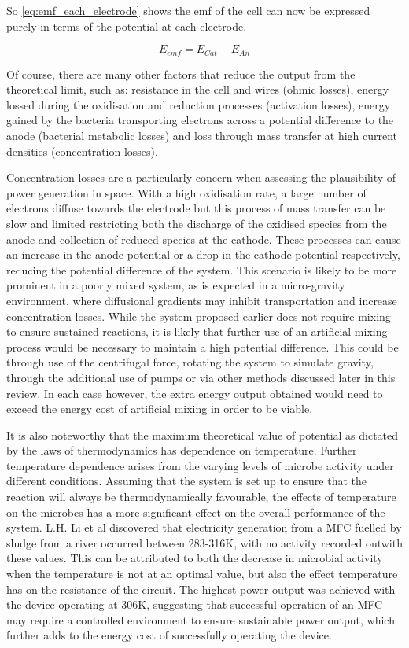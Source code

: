 \documentclass[12pt]{article}
\begin{document}
So \cref{eq:emf_each_electrode} shows the emf of the cell can now be expressed purely in terms of the potential at each electrode. \cite{logan2006microbial}

\begin{equation}
E_{emf} = E_{Cat} - E_{An}
\label{eq:emf_each_electrode}
\end{equation}

Of course, there are many other factors that reduce the output from the theoretical limit, such as: resistance in the cell and wires (ohmic losses), energy lossed during the oxidisation and reduction processes (activation losses), energy gained by the bacteria transporting electrons across a potential difference to the anode (bacterial metabolic losses) and loss through mass transfer at high current densities (concentration losses).\cite{logan2006microbial}

Concentration losses are a particularly concern when assessing the plausibility of power generation in space. With a high oxidisation rate, a large number of electrons diffuse towards the electrode but this process of mass transfer can be slow and limited restricting both the discharge of the oxidised species from the anode and collection of reduced species at the cathode. These processes can cause an increase in the anode potential or a drop in the cathode potential respectively, reducing the potential difference of the system. This scenario is likely to be more prominent in a poorly mixed system, as is expected in a micro-gravity environment, where diffusional gradients may inhibit transportation and increase concentration losses. While the system proposed earlier does not require mixing to ensure sustained reactions, it is likely that further use of an artificial mixing process would be necessary to maintain a high potential difference. This could be through use of the centrifugal force, rotating the system to simulate gravity, through the additional use of pumps or via other methods discussed later in this review. In each case however, the extra energy output obtained would need to exceed the energy cost of artificial mixing in order to be viable. 

It is also noteworthy that the maximum theoretical value of potential as dictated by the laws of thermodynamics has dependence on temperature. Further temperature dependence arises from the varying levels of microbe activity under different conditions. Assuming that the system is set up to ensure that the reaction will always be thermodynamically favourable, the effects of temperature on the microbes has a more significant effect on the overall performance of the system. L.H. Li et al \cite{li2013effect} discovered that electricity generation from a MFC fuelled by sludge from a river occurred between 283-316K, with no activity recorded outwith these values. This can be attributed to both the decrease in microbial activity when the temperature is not at an optimal value, but also the effect temperature has on the resistance of the circuit. The highest power output was achieved with the device operating at 306K, suggesting that successful operation of an MFC may require a controlled environment to ensure sustainable power output, which further adds to the energy cost of successfully operating the device.
\end{document}
